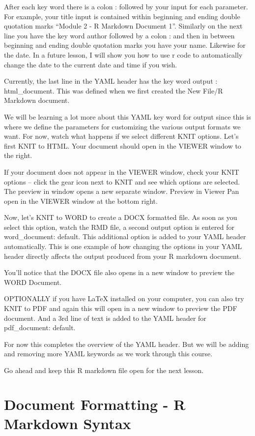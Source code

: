 \documentclass[]{book}
\theoremstyle{definition}
\theoremstyle{definition}
\theoremstyle{definition}
\theoremstyle{remark}
\begin{document}
After each key word there is a colon : followed by your input for each
parameter. For example, your title input is contained within beginning
and ending double quotation marks ``Module 2 - R Markdown Document 1''.
Similarly on the next line you have the key word author followed by a
colon : and then in between beginning and ending double quotation marks
you have your name. Likewise for the date. In a future lesson, I will
show you how to use r code to automatically change the date to the
current date and time if you wish.

Currently, the last line in the YAML header has the key word output :
html\_document. This was defined when we first created the New File/R
Markdown document.

We will be learning a lot more about this YAML key word for output since
this is where we define the parameters for customizing the various
output formats we want. For now, watch what happens if we select
different KNIT options. Let's first KNIT to HTML. Your document should
open in the VIEWER window to the right.

If your document does not appear in the VIEWER window, check your KNIT
options -- click the gear icon next to KNIT and see which options are
selected. The preview in window opens a new separate window. Preview in
Viewer Pan open in the VIEWER window at the bottom right.

Now, let's KNIT to WORD to create a DOCX formatted file. As soon as you
select this option, watch the RMD file, a second output option is
entered for word\_document: default. This additional option is added to
your YAML header automatically. This is one example of how changing the
options in your YAML header directly affects the output produced from
your R markdown document.

You'll notice that the DOCX file also opens in a new window to preview
the WORD Document.

OPTIONALLY if you have LaTeX installed on your computer, you can also
try KNIT to PDF and again this will open in a new window to preview the
PDF document. And a 3rd line of text is added to the YAML header for
pdf\_document: default.

For now this completes the overview of the YAML header. But we will be
adding and removing more YAML keywords as we work through this course.

Go ahead and keep this R markdown file open for the next lesson.

\chapter{Document Formatting - R Markdown Syntax}\label{rmdsyntax}
\end{document}

